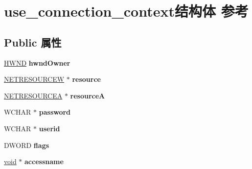 \hypertarget{structuse__connection__context}{}\section{use\+\_\+connection\+\_\+context结构体 参考}
\label{structuse__connection__context}
\subsection*{Public 属性}
\begin{DoxyCompactItemize}
\item 
\mbox{\label{structuse__connection__context_a0a765202a0a06d3fc5a9e1ebdb152148}} 
\hyperlink{interfacevoid}{H\+W\+ND} {\bfseries hwnd\+Owner}
\item 
\mbox{\label{structuse__connection__context_ae26e723460906de120c74d909e123a08}} 
\hyperlink{struct___n_e_t_r_e_s_o_u_r_c_e_w}{N\+E\+T\+R\+E\+S\+O\+U\+R\+C\+EW} $\ast$ {\bfseries resource}
\item 
\mbox{\label{structuse__connection__context_a8b230332c1c2f905b4a80860e5c6a383}} 
\hyperlink{struct___n_e_t_r_e_s_o_u_r_c_e_a}{N\+E\+T\+R\+E\+S\+O\+U\+R\+C\+EA} $\ast$ {\bfseries resourceA}
\item 
\mbox{\label{structuse__connection__context_a143faaaa62e0cdd563bf1e8cd0d8504a}} 
W\+C\+H\+AR $\ast$ {\bfseries password}
\item 
\mbox{\label{structuse__connection__context_ada74f58e9d78aef6bb9539f900d639ab}} 
W\+C\+H\+AR $\ast$ {\bfseries userid}
\item 
\mbox{\label{structuse__connection__context_a936f5549db891e12376175224b6fc8df}} 
D\+W\+O\+RD {\bfseries flags}
\item 
\mbox{\label{structuse__connection__context_a94c62eadeeed07690a92dbc290af214a}} 
\hyperlink{interfacevoid}{void} $\ast$ {\bfseries accessname}
\item 
\mbox{\label{structuse__connection__context_a1d74312da5e8e2acc78438c60dcfd88c}} 

\end{DoxyCompactItemize}
